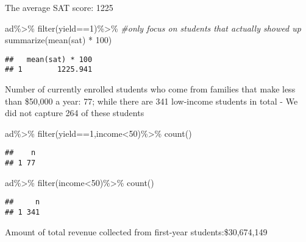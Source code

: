 \documentclass[
]{article}
\newenvironment{Shaded}{\begin{snugshade}}{\end{snugshade}}
\newcommand{\CommentTok}[1]{\textcolor[rgb]{0.56,0.35,0.01}{\textit{#1}}}
\newcommand{\DecValTok}[1]{\textcolor[rgb]{0.00,0.00,0.81}{#1}}
\newcommand{\FunctionTok}[1]{\textcolor[rgb]{0.00,0.00,0.00}{#1}}
\newcommand{\NormalTok}[1]{#1}
\newcommand{\SpecialCharTok}[1]{\textcolor[rgb]{0.00,0.00,0.00}{#1}}
\begin{document}
The average SAT score: 1225

\begin{Shaded}
\begin{Highlighting}[]
\NormalTok{ad}\SpecialCharTok{\%\textgreater{}\%}
  \FunctionTok{filter}\NormalTok{(yield}\SpecialCharTok{==}\DecValTok{1}\NormalTok{)}\SpecialCharTok{\%\textgreater{}\%} \CommentTok{\#only focus on students that actually showed up}
  \FunctionTok{summarize}\NormalTok{(}\FunctionTok{mean}\NormalTok{(sat) }\SpecialCharTok{*} \DecValTok{100}\NormalTok{)}
\end{Highlighting}
\end{Shaded}

\begin{verbatim}
##   mean(sat) * 100
## 1        1225.941
\end{verbatim}

Number of currently enrolled students who come from families that make
less than \$50,000 a year: 77; while there are 341 low-income students
in total - We did not capture 264 of these students

\begin{Shaded}
\begin{Highlighting}[]
\NormalTok{ad}\SpecialCharTok{\%\textgreater{}\%}
  \FunctionTok{filter}\NormalTok{(yield}\SpecialCharTok{==}\DecValTok{1}\NormalTok{,income}\SpecialCharTok{\textless{}}\DecValTok{50}\NormalTok{)}\SpecialCharTok{\%\textgreater{}\%}
  \FunctionTok{count}\NormalTok{()}
\end{Highlighting}
\end{Shaded}

\begin{verbatim}
##    n
## 1 77
\end{verbatim}

\begin{Shaded}
\begin{Highlighting}[]
\NormalTok{ad}\SpecialCharTok{\%\textgreater{}\%}
  \FunctionTok{filter}\NormalTok{(income}\SpecialCharTok{\textless{}}\DecValTok{50}\NormalTok{)}\SpecialCharTok{\%\textgreater{}\%}
  \FunctionTok{count}\NormalTok{()}
\end{Highlighting}
\end{Shaded}

\begin{verbatim}
##     n
## 1 341
\end{verbatim}

Amount of total revenue collected from first-year students:\$30,674,149
\end{document}
